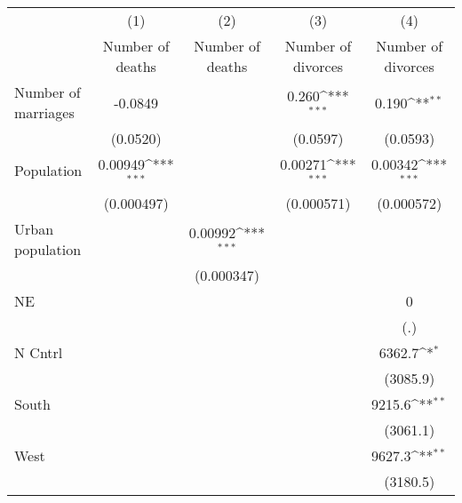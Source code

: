 {
\def\sym#1{\ifmmode^{#1}\else\(^{#1}\)\fi}
\begin{tabular}{l*{4}{c}}
\hline\hline
                    &\multicolumn{1}{c}{(1)}&\multicolumn{1}{c}{(2)}&\multicolumn{1}{c}{(3)}&\multicolumn{1}{c}{(4)}\\
                    &\multicolumn{1}{c}{Number of deaths}&\multicolumn{1}{c}{Number of deaths}&\multicolumn{1}{c}{Number of divorces}&\multicolumn{1}{c}{Number of divorces}\\
\hline
Number of marriages &     -0.0849         &                     &       0.260\sym{***}&       0.190\sym{**} \\
                    &    (0.0520)         &                     &    (0.0597)         &    (0.0593)         \\
[1em]
Population          &     0.00949\sym{***}&                     &     0.00271\sym{***}&     0.00342\sym{***}\\
                    &  (0.000497)         &                     &  (0.000571)         &  (0.000572)         \\
[1em]
Urban population    &                     &     0.00992\sym{***}&                     &                     \\
                    &                     &  (0.000347)         &                     &                     \\
[1em]
NE                  &                     &                     &                     &           0         \\
                    &                     &                     &                     &         (.)         \\
[1em]
N Cntrl             &                     &                     &                     &      6362.7\sym{*}  \\
                    &                     &                     &                     &    (3085.9)         \\
[1em]
South               &                     &                     &                     &      9215.6\sym{**} \\
                    &                     &                     &                     &    (3061.1)         \\
[1em]
West                &                     &                     &                     &      9627.3\sym{**} \\
                    &                     &                     &                     &    (3180.5)         \\

\end{tabular}}
